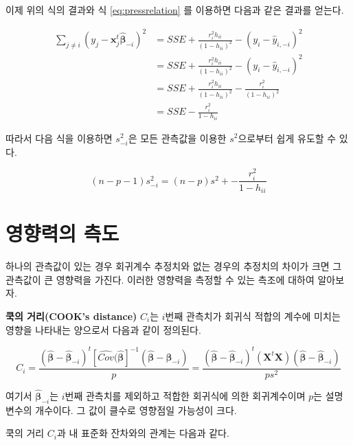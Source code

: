\documentclass[
  10pt,
]{book}
\theoremstyle{definition}
\theoremstyle{definition}
\theoremstyle{definition}
\theoremstyle{definition}
\theoremstyle{remark}
\begin{document}
이제 위의 식의 결과와 식 \eqref{eq:pressrelation} 를 이용하면 다음과 같은
결과를 얻는다.

\begin{align}
\sum_{j \ne i} (y_j - {\bm x}_j^t \hat{ \bm \beta}_{-i} )^2   
 & =  SSE  + \frac{r^2_i h_{ii}}{(1-h_{ii})^2}   -  (y_i - \hat {y}_{i,-i} )^2 \\
 & = SSE  + \frac{r^2_i h_{ii}}{(1-h_{ii})^2}   -  (y_i - \hat {y}_{i,-i} )^2 \\
  & = SSE  + \frac{r^2_i h_{ii}}{(1-h_{ii})^2}   -   \frac{r^2_i}{(1-h_{ii})^2} \\
  & = SSE  - \frac{r^2_i }{1-h_{ii}}    
\label{eq:sseminusi2}
\end{align}

따라서 다음 식을 이용하면 \(s^2_{-i}\)은 모든 관측값을 이용한
\(s^2\)으로부터 쉽게 유도할 수 있다.

\begin{equation}
(n-p-1) s^2_{-i} = (n-p)s^2 + - \frac{r^2_i }{1-h_{ii}}    
\label{eq:s2relation}
\end{equation}

\hypertarget{uxc601uxd5a5uxb825uxc758-uxce21uxb3c4}{%
\section{영향력의 측도}\label{uxc601uxd5a5uxb825uxc758-uxce21uxb3c4}}

하나의 관측값이 있는 경우 회귀계수 추정치와 없는 경우의 추정치의 차이가
크면 그 관측값이 큰 영향력을 가진다. 이러한 영향력을 측정할 수 있는
측조에 대하여 알아보자.

\textbf{쿡의 거리(COOK's distance)} \(C_i\)는 \(i\)번째 관측치가 회귀식 적합의
계수에 미치는 영향을 나타내는 양으로서 다음과 같이 정의된다.

\begin{equation}
C_i = \frac{  (\hat{ \bm \beta} -\hat{ \bm \beta}_{-i})^t [ \widehat {Cov}(\hat {\bm \beta}]^{-1} 
 (\hat{ \bm \beta} -\hat{ \bm \beta}_{-i}) } {p} = \frac{  (\hat{ \bm \beta} -\hat{ \bm \beta}_{-i})^t (\bm X^t \bm X) (\hat{ \bm \beta} -\hat{ \bm \beta}_{-i}) } {p s^2} 
\label{eq:cookdist}
\end{equation}

여기서 \(\hat{ \bm \beta}_{-i}\)는 \(i\)번째 관측치를 제외하고 적합한
회귀식에 의한 회귀계수이며 \(p\)는 설명변수의 개수이다. 그 값이 클수로
영향점일 가능성이 크다.

쿡의 거리 \(C_i\)과 내 표준화 잔차와의 관계는 다음과 같다.
\end{document}
